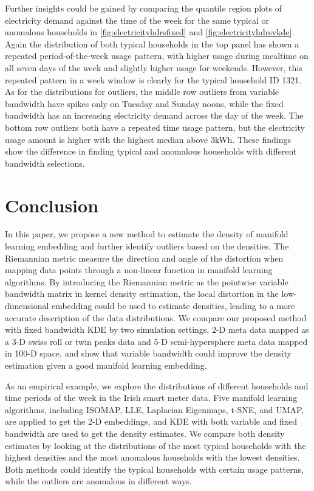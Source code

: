 \documentclass[11pt,a4paper,]{article}
\begin{document}
Further insights could be gained by comparing the quantile region plots of electricity demand against the time of the week for the same typical or anomalous households in \autoref{fig:electricityhdrsfixed} and \autoref{fig:electricityhdrsvkde}.
Again the distribution of both typical households in the top panel has shown a repeated period-of-the-week usage pattern, with higher usage during mealtime on all seven days of the week and slightly higher usage for weekends. However, this repeated pattern in a week window is clearly for the typical household ID 1321. As for the distributions for outliers, the middle row outliers from variable bandwidth have spikes only on Tuesday and Sunday noons, while the fixed bandwidth has an increasing electricity demand across the day of the week. The bottom row outliers both have a repeated time usage pattern, but the electricity usage amount is higher with the highest median above 3kWh. These findings show the difference in finding typical and anomalous households with different bandwidth selections.

\hypertarget{conclusion}{%
\section{Conclusion}\label{conclusion}}

In this paper, we propose a new method to estimate the density of manifold learning embedding and further identify outliers based on the densities. The Riemannian metric measure the direction and angle of the distortion when mapping data points through a non-linear function in manifold learning algorithms. By introducing the Riemannian metric as the pointwise variable bandwidth matrix in kernel density estimation, the local distortion in the low-dimensional embedding could be used to estimate densities, leading to a more accurate description of the data distributions. We compare our proposed method with fixed bandwidth KDE by two simulation settings, 2-D meta data mapped as a 3-D swiss roll or twin peaks data and 5-D semi-hypersphere meta data mapped in 100-D space, and show that variable bandwidth could improve the density estimation given a good manifold learning embedding.

As an empirical example, we explore the distributions of different households and time periods of the week in the Irish smart meter data. Five manifold learning algorithms, including ISOMAP, LLE, Laplacian Eigenmaps, t-SNE, and UMAP, are applied to get the 2-D embeddings, and KDE with both variable and fixed bandwidth are used to get the density estimates. We compare both density estimates by looking at the distributions of the most typical households with the highest densities and the most anomalous households with the lowest densities. Both methods could identify the typical households with certain usage patterns, while the outliers are anomalous in different ways.
\end{document}
